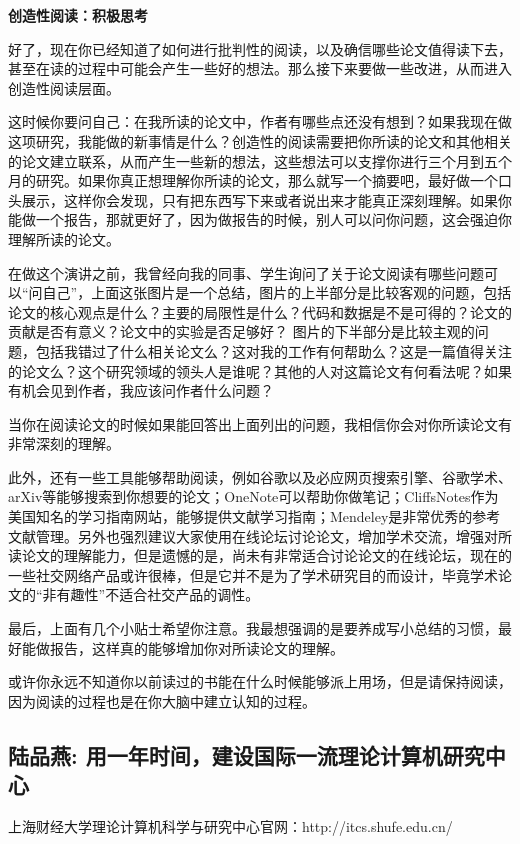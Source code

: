  
 {\bf 创造性阅读：积极思考}
 
 好了，现在你已经知道了如何进行批判性的阅读，以及确信哪些论文值得读下去，甚至在读的过程中可能会产生一些好的想法。那么接下来要做一些改进，从而进入创造性阅读层面。
 
这时候你要问自己：在我所读的论文中，作者有哪些点还没有想到？如果我现在做这项研究，我能做的新事情是什么？创造性的阅读需要把你所读的论文和其他相关的论文建立联系，从而产生一些新的想法，这些想法可以支撑你进行三个月到五个月的研究。如果你真正想理解你所读的论文，那么就写一个摘要吧，最好做一个口头展示，这样你会发现，只有把东西写下来或者说出来才能真正深刻理解。如果你能做一个报告，那就更好了，因为做报告的时候，别人可以问你问题，这会强迫你理解所读的论文。

在做这个演讲之前，我曾经向我的同事、学生询问了关于论文阅读有哪些问题可以“问自己”，上面这张图片是一个总结，图片的上半部分是比较客观的问题，包括论文的核心观点是什么？主要的局限性是什么？代码和数据是不是可得的？论文的贡献是否有意义？论文中的实验是否足够好？
图片的下半部分是比较主观的问题，包括我错过了什么相关论文么？这对我的工作有何帮助么？这是一篇值得关注的论文么？这个研究领域的领头人是谁呢？其他的人对这篇论文有何看法呢？如果有机会见到作者，我应该问作者什么问题？

当你在阅读论文的时候如果能回答出上面列出的问题，我相信你会对你所读论文有非常深刻的理解。

此外，还有一些工具能够帮助阅读，例如谷歌以及必应网页搜索引擎、谷歌学术、arXiv等能够搜索到你想要的论文；OneNote可以帮助你做笔记；CliffsNotes作为美国知名的学习指南网站，能够提供文献学习指南；Mendeley是非常优秀的参考文献管理。另外也强烈建议大家使用在线论坛讨论论文，增加学术交流，增强对所读论文的理解能力，但是遗憾的是，尚未有非常适合讨论论文的在线论坛，现在的一些社交网络产品或许很棒，但是它并不是为了学术研究目的而设计，毕竟学术论文的“非有趣性”不适合社交产品的调性。

最后，上面有几个小贴士希望你注意。我最想强调的是要养成写小总结的习惯，最好能做报告，这样真的能够增加你对所读论文的理解。

或许你永远不知道你以前读过的书能在什么时候能够派上用场，但是请保持阅读，因为阅读的过程也是在你大脑中建立认知的过程。


\subsection{陆品燕: 用一年时间，建设国际一流理论计算机研究中心}

上海财经大学理论计算机科学与研究中心官网：http://itcs.shufe.edu.cn/

